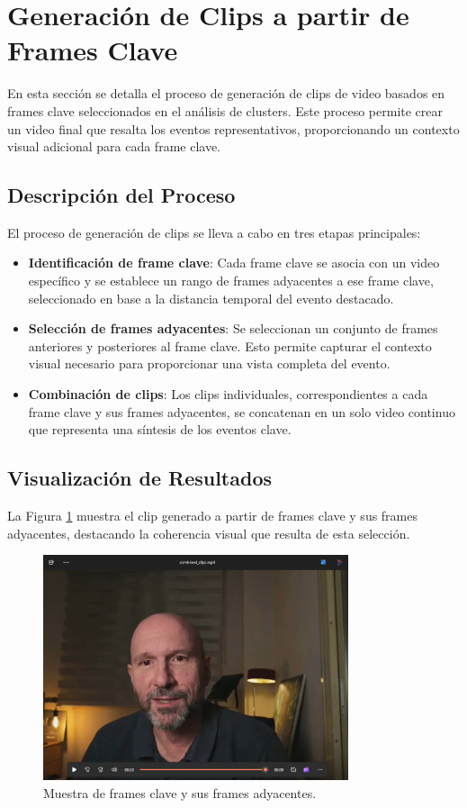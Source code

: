 \section{Generación de Clips a partir de Frames Clave}

En esta sección se detalla el proceso de generación de clips de video basados en frames clave seleccionados en el análisis de clusters. Este proceso permite crear un video final que resalta los eventos representativos, proporcionando un contexto visual adicional para cada frame clave.

\subsection{Descripción del Proceso}
El proceso de generación de clips se lleva a cabo en tres etapas principales:

\begin{itemize}
    \item \textbf{Identificación de frame clave}: Cada frame clave se asocia con un video específico y se establece un rango de frames adyacentes a ese frame clave, seleccionado en base a la distancia temporal del evento destacado.
    \item \textbf{Selección de frames adyacentes}: Se seleccionan un conjunto de frames anteriores y posteriores al frame clave. Esto permite capturar el contexto visual necesario para proporcionar una vista completa del evento.
    \item \textbf{Combinación de clips}: Los clips individuales, correspondientes a cada frame clave y sus frames adyacentes, se concatenan en un solo video continuo que representa una síntesis de los eventos clave.
\end{itemize}

\subsection{Visualización de Resultados}
La Figura \ref{fig:clip_muestra} muestra el clip generado a partir de frames clave y sus frames adyacentes, destacando la coherencia visual que resulta de esta selección.

\begin{figure}[H]
    \centering
    \includegraphics[width=0.8\textwidth]{4/figures/Clip_1.png}
    \caption{Muestra de frames clave y sus frames adyacentes.}
    \label{fig:clip_muestra}
\end{figure}

